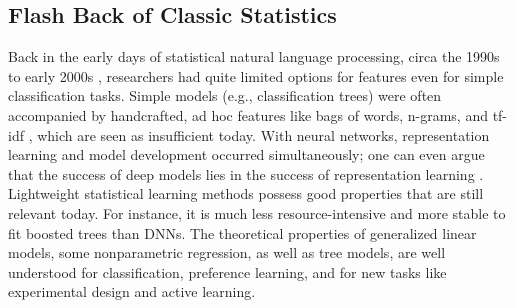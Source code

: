 









\subsection{Flash Back of Classic Statistics}
Back in the early days of statistical natural language processing, circa the 1990s to early 2000s \citep[for even earlier history, we refer to][]{jones1994natural}, researchers had quite limited options for features even for simple classification tasks. Simple models (e.g., classification trees) were often accompanied by handcrafted, ad hoc features like bags of words, n-grams, and tf-idf \citep{chowdhury2010introduction}, which are seen as insufficient today. With neural networks, representation learning and model development occurred simultaneously; one can even argue that the success of deep models lies in the success of representation learning \citep{bengio2013representation}. Lightweight statistical learning methods possess good properties that are still relevant today. For instance, it is much less resource-intensive and more stable to fit boosted trees than DNNs. The theoretical properties of generalized linear models, some nonparametric regression, as well as tree models, are well understood for classification, preference learning, and for new tasks like experimental design and active learning. 

